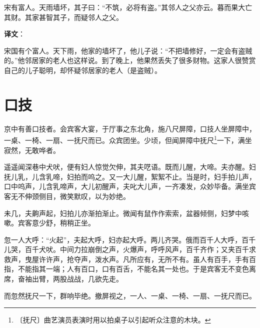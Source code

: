 \documentclass[12pt,UTF-8,openany]{ctexbook}
\begin{document}
\begin{normalsize}
    
    宋有富人。天雨墙坏，其子曰：“不筑，必将有盗。”其邻人之父亦云。暮而果大亡其财。其家甚智其子，而疑邻人之父。
\end{normalsize}


\newpage

\textbf{译文}：

\vspace{1em}

\begin{normalsize}
    
    宋国有个富人。天下雨，他家的墙坏了，他儿子说：“不把墙修好，一定会有盗贼的。”他邻居家的老人也这样说。到了晚上，他果然丢失了很多财物。这家人很赞赏自己的儿子聪明，却怀疑邻居家的老人（是盗贼）。
    
\end{normalsize}



\chapter{口技}

\begin{normalsize}
    
    京中有善口技者。会宾客大宴，于厅事之东北角，施八尺屏障，口技人坐屏障中，一桌、一椅、一扇、一抚尺而已。众宾团坐。少顷，但闻屏障中抚尺\footnote{〔抚尺〕曲艺演员表演时用以拍桌子以引起听众注意的木块。}一下，满坐寂然，无敢哗者。
    
    遥遥闻深巷中犬吠，便有妇人惊觉欠伸，其夫呓语。既而儿醒，大啼。夫亦醒。妇抚儿乳，儿含乳啼，妇拍而呜之。又一大儿醒，絮絮不止。当是时，妇手拍儿声，口中呜声，儿含乳啼声，大儿初醒声，夫叱大儿声，一齐凑发，众妙毕备。满坐宾客无不伸颈侧目，微笑默叹，以为妙绝。
    
    未几，夫齁声起，妇拍儿亦渐拍渐止。微闻有鼠作作索索，盆器倾侧，妇梦中咳嗽。宾客意少舒，稍稍正坐。
    
    忽一人大呼：“火起”，夫起大呼，妇亦起大呼。两儿齐哭。俄而百千人大呼，百千儿哭，百千犬吠。中间力拉崩倒之声，火爆声，呼呼风声，百千齐作；又夹百千求救声，曳屋许许声，抢夺声，泼水声。凡所应有，无所不有。虽人有百手，手有百指，不能指其一端；人有百口，口有百舌，不能名其一处也。于是宾客无不变色离席，奋袖出臂，两股战战，几欲先走。
    
    而忽然抚尺一下，群响毕绝。撤屏视之，一人、一桌、一椅、一扇、一抚尺而已。
\end{normalsize}


\newpage
\end{document}
